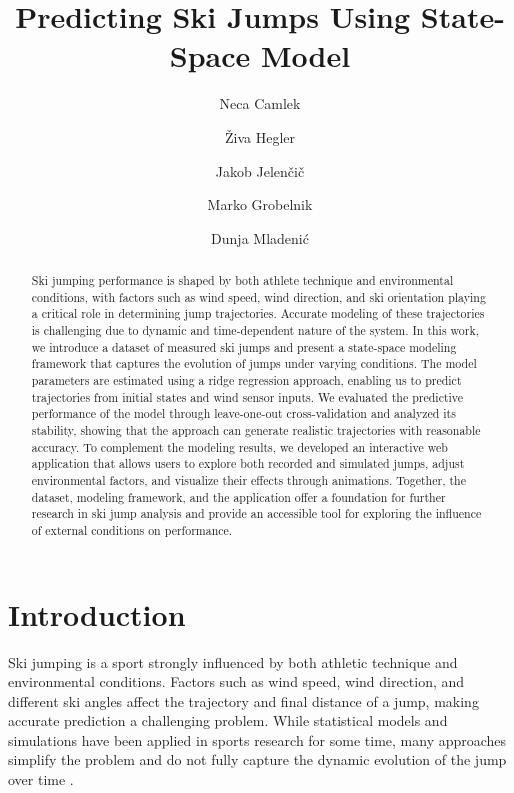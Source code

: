 \documentclass[sigconf]{acmart}
\title{Predicting Ski Jumps Using State-Space Model}
\author{Neca Camlek}
\affiliation{%
  \institution{Univerza v Ljubljani}
  \city{Ljubljana}
  \country{Slovenia}
}
\author{Živa Hegler}
\affiliation{%
  \institution{Univerza v Ljubljani}
  \city{Ljubljana}
  \country{Slovenia}
}
\author{Jakob Jelenčič}
\affiliation{%
  \institution{Jožef Stefan Institute}
  \city{Ljubljana}
  \country{Slovenia}
}
\author{Marko Grobelnik}
\affiliation{%
  \institution{Jožef Stefan Institute}
  \city{Ljubljana}
  \country{Slovenia}
}
\author{Dunja Mladenić}
\affiliation{%
  \institution{Jožef Stefan Institute}
  \city{Ljubljana}
  \country{Slovenia}
}
\begin{document}
\begin{abstract}
Ski jumping performance is shaped by both athlete technique and environmental
conditions, with factors such as wind speed, wind direction, and ski orientation
playing a critical role in determining jump trajectories. Accurate modeling of
these trajectories is challenging due to dynamic and time-dependent nature of
the system. In this work, we introduce a dataset of measured ski jumps and
present a state-space modeling framework that captures the evolution of jumps
under varying conditions. The model parameters are estimated using a ridge
regression approach, enabling us to predict trajectories from initial states and
wind sensor inputs. We evaluated the predictive performance of the model
through leave-one-out cross-validation and analyzed its stability, showing that
the approach can generate realistic trajectories with reasonable accuracy. To
complement the modeling results, we developed an interactive web application
that allows users to explore both recorded and simulated jumps, adjust
environmental factors, and visualize their effects through animations. Together,
the dataset, modeling framework, and the application offer a foundation for
further research in ski jump analysis and provide an accessible tool for
exploring the influence of external conditions on performance.
\end{abstract}


\nocite{warehouse2025,aoki1990,bergmann2025,cai2021,mueller2008,mueller2006,plestenjak2016,posit2025,serrano2025,skijumphillarchive2025,thompson2025,vanwieringen2015,virmavirta2019,statquest2025}

\maketitle

\section{Introduction}
Ski jumping is a sport strongly influenced by both athletic technique and
environmental conditions. Factors such as wind speed, wind direction, and
different ski angles affect the trajectory and final distance of a jump, making
accurate prediction a challenging problem. While statistical models and
simulations have been applied in sports research for some time, many approaches
simplify the problem and do not fully capture the dynamic evolution of the jump
over time \cite{thompson2025}.
\end{document}
